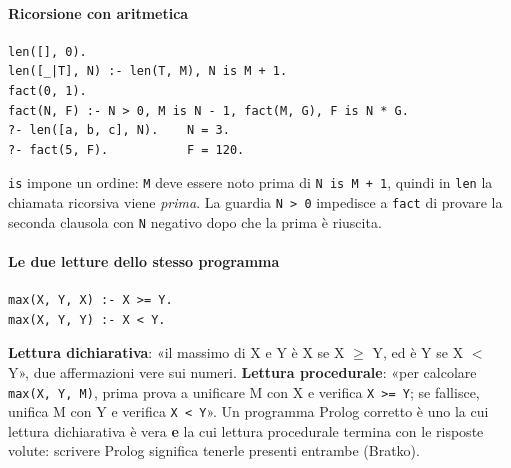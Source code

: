 \documentclass[a4paper,12pt]{article}
\begin{document}
\paragraph{Ricorsione con aritmetica}
\begin{verbatim}
len([], 0).
len([_|T], N) :- len(T, M), N is M + 1.
fact(0, 1).
fact(N, F) :- N > 0, M is N - 1, fact(M, G), F is N * G.
?- len([a, b, c], N).    N = 3.
?- fact(5, F).           F = 120.
\end{verbatim}
\texttt{is} impone un ordine: \texttt{M} deve essere noto prima di \texttt{N is M + 1}, quindi in
\texttt{len} la chiamata ricorsiva viene \emph{prima}. La guardia \texttt{N > 0} impedisce a
\texttt{fact} di provare la seconda clausola con \texttt{N} negativo dopo che la prima è riuscita.

\paragraph{Le due letture dello stesso programma}
\begin{verbatim}
max(X, Y, X) :- X >= Y.
max(X, Y, Y) :- X < Y.
\end{verbatim}
\textbf{Lettura dichiarativa}: «il massimo di X e Y è X se X $\geq$ Y, ed è Y se X $<$ Y», due
affermazioni vere sui numeri. \textbf{Lettura procedurale}: «per calcolare
\texttt{max(X, Y, M)}, prima prova a unificare M con X e verifica \texttt{X >= Y}; se fallisce,
unifica M con Y e verifica \texttt{X < Y}». Un programma Prolog corretto è uno la cui lettura
dichiarativa è vera \textbf{e} la cui lettura procedurale termina con le risposte volute:
scrivere Prolog significa tenerle presenti entrambe (Bratko).
\end{document}
